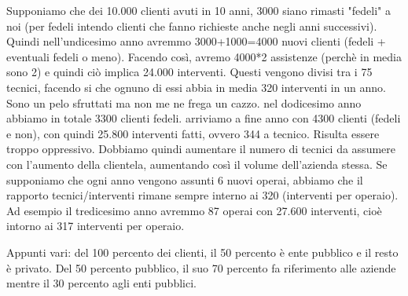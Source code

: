 \documentclass[legalpaper]{article}
\begin{document}
	Supponiamo che dei 10.000 clienti avuti in 10 anni, 3000 siano rimasti "fedeli" a noi (per fedeli intendo clienti che fanno richieste anche negli anni successivi). Quindi nell'undicesimo anno avremmo 3000+1000=4000 nuovi clienti (fedeli + eventuali fedeli o meno).
	Facendo così, avremo 4000*2 assistenze (perchè in media sono 2) e quindi ciò implica 24.000 interventi.
	Questi vengono divisi tra i 75 tecnici, facendo si che ognuno di essi abbia in media 320 interventi in un anno. Sono un pelo sfruttati ma non me ne frega un cazzo.
	nel dodicesimo anno abbiamo in totale 3300 clienti fedeli. arriviamo a fine anno con 4300 clienti (fedeli e non), con quindi 25.800 interventi fatti, ovvero 344 a tecnico. Risulta essere troppo oppressivo. Dobbiamo quindi aumentare il numero di tecnici da assumere con l'aumento della clientela, aumentando così il volume dell'azienda stessa. Se supponiamo che ogni anno vengono assunti 6 nuovi operai, abbiamo che il rapporto tecnici/interventi rimane sempre interno ai 320 (interventi per operaio).
	Ad esempio il tredicesimo anno avremmo 87 operai con 27.600 interventi, cioè intorno ai 317 interventi per operaio.
	

	Appunti vari: del 100 percento dei clienti, il 50 percento è ente pubblico e il resto è privato. Del 50 percento pubblico, il suo 70 percento fa riferimento alle aziende mentre il 30 percento agli enti pubblici.
	
	
	
	
	
			
\end{document}
